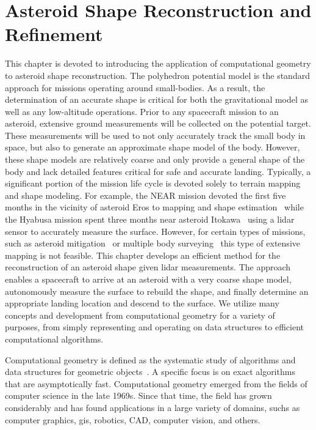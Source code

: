 
\chapter{Asteroid Shape Reconstruction and Refinement}\label{sec:shape_reconstruction}
This chapter is devoted to introducing the application of computational geometry to asteroid shape reconstruction.
The polyhedron potential model is the standard approach for missions operating around small-bodies.
As a result, the determination of an accurate shape is critical for both the gravitational model as well as any low-altitude operations.
Prior to any spacecraft mission to an asteroid, extensive ground measurements will be collected on the potential target.
These measurements will be used to not only accurately track the small body in space, but also to generate an approximate shape model of the body. 
However, these shape models are relatively coarse and only provide a general shape of the body and lack detailed features critical for safe and accurate landing.
Typically, a significant portion of the mission life cycle is devoted solely to terrain mapping and shape modeling.
For example, the NEAR mission devoted the first five months in the vicinity of asteroid Eros to mapping and shape estimation~\cite{antreasian2002} while the Hyabusa mission spent three months near asteroid Itokawa~\cite{barnouin-jha2008} using a \gls{lidar} sensor to accurately measure the surface.
However, for certain types of missions, such as asteroid mitigation~\cite{garshnek2000,pitz2014} or multiple body surveying~\cite{stuart2011a,stuart2016} this type of extensive mapping is not feasible.
This chapter develops an efficient method for the reconstruction of an asteroid shape given \gls{lidar} measurements.
The approach enables a spacecraft to arrive at an asteroid with a very coarse shape model, autonomously measure the surface to rebuild the shape, and finally determine an appropriate landing location and descend to the surface.
We utilize many concepts and development from computational geometry for a variety of purposes, from simply representing and operating on data structures to efficient computational algorithms.

Computational geometry is defined as the systematic study of algorithms and data structures for geometric objects~\cite{berg2008}.
A specific focus is on exact algorithms that are asymptotically fast.
Computational geometry emerged from the fields of computer science in the late 1969s.
Since that time, the field has grown considerably and has found applications in a large variety of domains, suchs as computer graphics, \gls{gis}, robotics, \gls{CAD}, computer vision, and others.

